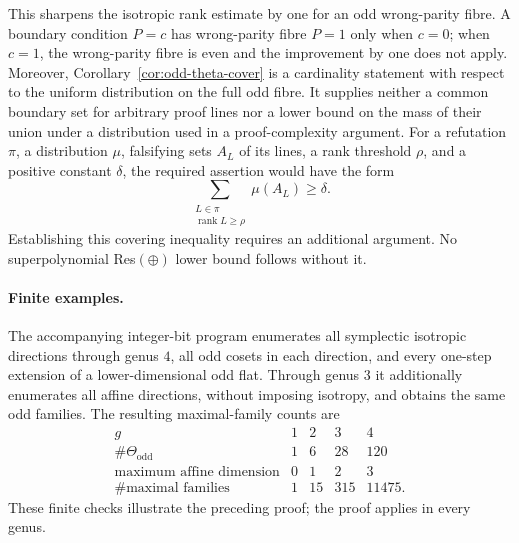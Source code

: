 This sharpens the isotropic rank estimate by one for an odd
wrong-parity fibre. A boundary condition \(P=c\) has wrong-parity fibre
\(P=1\) only when \(c=0\); when \(c=1\), the wrong-parity fibre is even
and the improvement by one does not apply. Moreover,
Corollary~\ref{cor:odd-theta-cover} is a cardinality statement with
respect to the uniform distribution on the full odd fibre. It supplies
neither a common boundary set for arbitrary proof lines nor a lower
bound on the mass of their union under a
distribution used in a proof-complexity argument. For a refutation $\pi$, a distribution $\mu$, falsifying sets $A_L$ of its lines, a rank threshold $\rho$, and a positive constant $\delta$, the required assertion would have the form
\begin{equation}
 \sum_{\substack{L\in\pi\\\operatorname{rank}L\geq\rho}}
       \mu(A_L)\geq\delta.
 \label{eq:theta-m3-not-proved}
\end{equation}
Establishing this covering inequality requires an additional argument. No
superpolynomial Res\((\oplus)\) lower bound follows without it.

\paragraph{Finite examples.}
The accompanying integer-bit program enumerates all symplectic
isotropic directions through genus \(4\), all odd cosets in each
direction, and every one-step extension of a lower-dimensional odd
flat. Through genus \(3\) it additionally enumerates all affine
directions, without imposing isotropy, and obtains the same odd
families. The resulting maximal-family counts are
\[
\begin{array}{c|rrrr}
g&1&2&3&4\\ \hline
\#\Theta_{\mathrm{odd}}&1&6&28&120\\
\text{maximum affine dimension}&0&1&2&3\\
\#\text{maximal families}&1&15&315&11475 .
\end{array}
\]
These finite checks illustrate the preceding proof; the proof applies in every genus.

